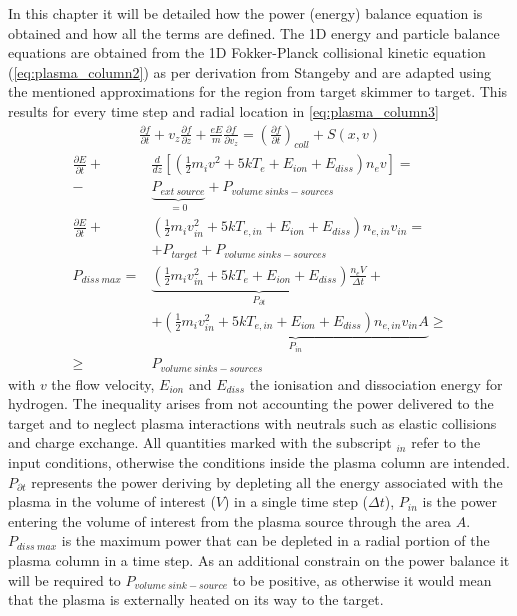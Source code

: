 In this chapter it will be detailed how the power (energy) balance equation is obtained and how all the terms are defined.
The 1D energy and particle balance equations are obtained from the 1D Fokker-Planck collisional kinetic equation (\autoref{eq:plasma_column2}) as per derivation from Stangeby\cite{Verhaegh2021} and are adapted using the mentioned approximations for the region from target skimmer to target. This results for every time step and radial location in \autoref{eq:plasma_column3}
\begin{equation}
\label{eq:plasma_column2}
\begin{aligned}
  \frac{ \partial f }{ \partial t}  + v_z \frac{\partial f}{\partial z}  + \frac{eE}{m} \frac{ \partial f }{ \partial v_z} = \left( \frac{ \partial f }{ \partial t} \right)_{coll}  +  S(x,v)
\end{aligned}
\end{equation}
\begin{equation}
\label{eq:plasma_column3}
\begin{aligned}
\frac{  \partial E }{ \partial t} +& \frac{d}{dz}  \left[ \left( \frac{1}{2} m_i v^2 + 5kT_e + E_{ion} + E_{diss} \right) n_e v \right] =\\ -& \underbrace{P_{ext\ source}}_{= 0} + P_{ volume\ sinks-sources }
\\
\frac{  \partial E }{ \partial t} +& \left( \frac{1}{2} m_i v_{in}^2 + 5kT_{e,in} + E_{ion} + E_{diss} \right) n_{e,in} v_{in} =\\ &  + P_{ target } + P_{ volume\ sinks-sources }
\\
P_{diss \: max} =& \underbrace{ \left( \frac{1}{2} m_i v_{in}^2 + 5kT_e + E_{ion} + E_{diss} \right)  {\frac{n_e V}{\Delta t}}}_{P_{ \partial t}} + \\ &+ \underbrace{ \left( \frac{1}{2} m_i v_{in}^2 + 5kT_{e,in} + E_{ion} + E_{diss} \right) n_{e,in} v_{in}A}_{P_{in}} \geq \\ \geq & P_{ volume\ sinks-sources }
\end{aligned}
\end{equation}
with $v$ the flow velocity, $E_{ion}$ and $E_{diss}$ the ionisation and dissociation energy for hydrogen. The inequality arises from not accounting the power delivered to the target and to neglect plasma interactions with neutrals such as elastic collisions and charge exchange. All quantities marked with the subscript ${}_{in}$ refer to the input conditions, otherwise the conditions inside the plasma column are intended. $P_{\partial t}$ represents the power deriving by depleting all the energy associated with the plasma in the volume of interest ($V$) in a single time step ($\Delta t$), $P_{in}$ is the power entering the volume of interest from the plasma source through the area $A$. $P_{diss \: max}$ is the maximum power that can be depleted in a radial portion of the plasma column in a time step. As an additional constrain on the power balance it will be required to $P_{volume\ sink-source}$ to be positive, as otherwise it would mean that the plasma is externally heated on its way to the target.

